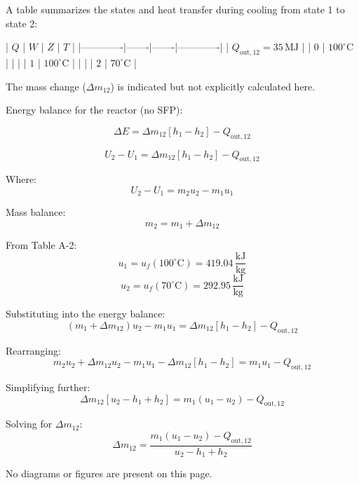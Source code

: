 A table summarizes the states and heat transfer during cooling from state 1 to state 2:  

| \(Q\)       | \(W\) | \(Z\) | \(T\)       |  
|-------------|-------|-------|-------------|  
| \(Q_{\text{out},12} = 35 \, \text{MJ}\) |       | \(0\)   | \(100^\circ\text{C}\) |  
|             |       | \(1\)   | \(100^\circ\text{C}\) |  
|             |       | \(2\)   | \(70^\circ\text{C}\)  |  

The mass change (\(\Delta m_{12}\)) is indicated but not explicitly calculated here.

Energy balance for the reactor (no SFP):  

\[
\Delta E = \Delta m_{12} \left[ h_1 - h_2 \right] - Q_{\text{out},12}
\]  

\[
U_2 - U_1 = \Delta m_{12} \left[ h_1 - h_2 \right] - Q_{\text{out},12}
\]  

Where:  
\[
U_2 - U_1 = m_2 u_2 - m_1 u_1
\]  

Mass balance:  
\[
m_2 = m_1 + \Delta m_{12}
\]  

From Table A-2:  
\[
u_1 = u_f(100^\circ\text{C}) = 419.04 \, \frac{\text{kJ}}{\text{kg}}
\]  
\[
u_2 = u_f(70^\circ\text{C}) = 292.95 \, \frac{\text{kJ}}{\text{kg}}
\]  

Substituting into the energy balance:  
\[
(m_1 + \Delta m_{12}) u_2 - m_1 u_1 = \Delta m_{12} \left[ h_1 - h_2 \right] - Q_{\text{out},12}
\]  

Rearranging:  
\[
m_2 u_2 + \Delta m_{12} u_2 - m_1 u_1 - \Delta m_{12} \left[ h_1 - h_2 \right] = m_1 u_1 - Q_{\text{out},12}
\]  

Simplifying further:  
\[
\Delta m_{12} \left[ u_2 - h_1 + h_2 \right] = m_1 (u_1 - u_2) - Q_{\text{out},12}
\]  

Solving for \( \Delta m_{12} \):  
\[
\Delta m_{12} = \frac{m_1 (u_1 - u_2) - Q_{\text{out},12}}{u_2 - h_1 + h_2}
\]  

No diagrams or figures are present on this page.